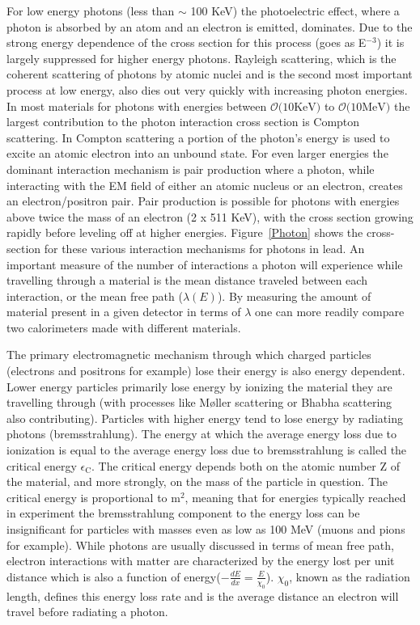 For low energy photons (less than $\sim$ 100 KeV) the photoelectric effect, where a photon is absorbed by an atom and an electron is emitted, dominates.  
Due to the strong energy dependence of the cross section for this process (goes as E$^{-3}$) it is largely suppressed for higher energy photons.   
Rayleigh scattering, which is the coherent scattering of photons by atomic nuclei and is the second most important process at low energy, also dies out very quickly with increasing photon energies.  
In most materials for photons with energies between $\mathcal{O}\mathrm(10 \mathrm{KeV})$ to $\mathcal{O}\mathrm(10 \mathrm{MeV})$ the largest contribution to the photon interaction cross section is Compton scattering.  
In Compton scattering a portion of the photon's energy is used to excite an atomic electron into an unbound state.  
For even larger energies the dominant interaction mechanism is pair production where a photon, while interacting with the EM field of either an atomic nucleus or an electron, creates an electron/positron pair.  
Pair production is possible for photons with energies above twice the mass of an electron (2 x 511 KeV), with the cross section growing rapidly before leveling off at higher energies.  
Figure~\ref{Photon} shows the cross-section for these various interaction mechanisms for photons in lead.  
An important measure of the number of interactions a photon will experience while travelling through a material is the mean distance traveled between each interaction, or the mean free path ($\lambda\left(E\right)$).  
By measuring the amount of material present in a given detector in terms of $\lambda$ one can more readily compare two calorimeters made with different materials.  


The primary electromagnetic mechanism through which charged particles (electrons and positrons for example) lose their energy is also energy dependent.  
Lower energy particles primarily lose energy by ionizing the material they are travelling through (with processes like M{\o}ller scattering or Bhabha scattering also contributing).  
Particles with higher energy tend to lose energy by radiating photons (bremsstrahlung).  
The energy at which the average energy loss due to ionization is equal to the average energy loss due to bremsstrahlung is called the critical energy $\epsilon_{\mathrm{C}}$.  
The critical energy depends both on the atomic number Z of the material, and more strongly, on the mass of the particle in question.  
The critical energy is proportional to m$^2$, meaning that for energies typically reached in experiment the bremsstrahlung component to the energy loss can be insignificant for particles with masses even as low as 100 MeV (muons and pions for example).  
While photons are usually discussed in terms of mean free path, electron interactions with matter are characterized by the energy lost per unit distance which is also a function of energy($-\frac{dE}{dx}=\frac{E}{\chi_{0}}$).  
$\chi_{0}$, known as the radiation length, defines this energy loss rate and is the average distance an electron will travel before radiating a photon.  

